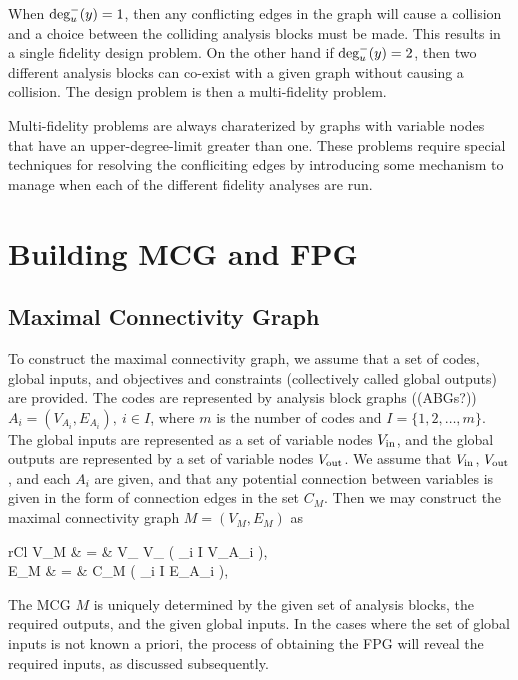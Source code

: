 	When $\textrm{deg}_u^-(y)=1$, then any conflicting edges in the graph will cause a collision
	and a choice between the colliding analysis blocks must be made. This results in a 
	single fidelity design problem. On the other hand if $\textrm{deg}_u^-(y)=2$, then two 
	different analysis blocks can co-exist with a given graph without causing a 
	collision. The design problem is then a multi-fidelity problem.

	Multi-fidelity problems are always charaterized by graphs with variable 
	nodes that have an upper-degree-limit greater than one. These problems require 
	special techniques for resolving the confliciting edges by introducing some mechanism
	to manage when each of the different fidelity analyses are 
	run\cite{march2012provably,alexandrov2001approximation,Huang_Allen_Notz_Miller_2006}.

\section{Building MCG and FPG}
	\label{s:building graphs}
\subsection{Maximal Connectivity Graph}
	\label{ss:MCG}
	To construct the maximal connectivity graph, we assume that a set of codes, global inputs, and objectives and constraints (collectively called global outputs) are provided. The codes are represented by analysis block graphs ((ABGs?)) $A_i=(V_{A_i},E_{A_i}), \ i\in I$, where $m$ is the number of codes and $I=\{1,2,\ldots,m\}$. The global inputs are represented as a set of variable nodes $V_\textrm{in}$, and the global outputs are represented by a set of variable nodes $V_\textrm{out}$. 
	We assume that $V_\textrm{in}$, $V_\textrm{out}$, and each $A_i$ are given, and that any potential connection between variables is given in the form of connection edges in the set $C_M$. 
	Then we may construct the maximal connectivity graph $M=(V_M,E_M)$ as
	\begin{IEEEeqnarray*}{rCl}
	V_M & = & V_ \cup V_ \cup \left( \bigcup_{i \in I} V_{A_i} \right), \\
	E_M & = & C_M \cup \left( \bigcup_{i \in I} E_{A_i} \right),
	\end{IEEEeqnarray*}
	The MCG $M$ is uniquely determined by the given set of analysis blocks, the required outputs, and the given global inputs. In the cases where the set of global inputs is not known a priori, the process of obtaining the FPG will reveal the required inputs, as discussed subsequently.

